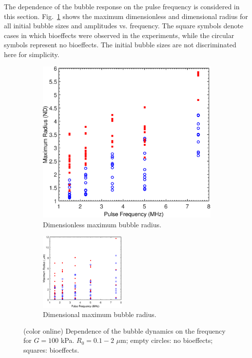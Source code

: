 The dependence of the bubble response on the pulse frequency is
considered in this section.  Fig.~\ref{figure:freq} shows the maximum
dimensionless and dimensional radius for all initial bubble sizes and
amplitudes vs. frequency. The square symbols denote cases in which
bioeffects were observed in the experiments, while the circular symbols
represent no bioeffects. The initial bubble sizes are not
discriminated here for simplicity.


\begin{figure}[t]
  \begin{subfigure}[b]{0.47\textwidth}
    \includegraphics[width=\textwidth]{./figs/bubble_figs/rstarmax_f}  
    \caption{Dimensionless maximum bubble radius.}
  \end{subfigure}

  \begin{subfigure}[b]{0.47\textwidth}
    \includegraphics[width=0.47\textwidth]{./figs/bubble_figs/rmax_f}      
    \caption{Dimensional maximum bubble radius.}
  \end{subfigure}
  \caption{(color online) Dependence of the bubble dynamics on the frequency for
    $G=100$ kPa. $R_0=0.1-2$ $\mu$m; empty circles: no bioeffects; squares:
    bioeffects.}
  \label{figure:freq}
\end{figure}

